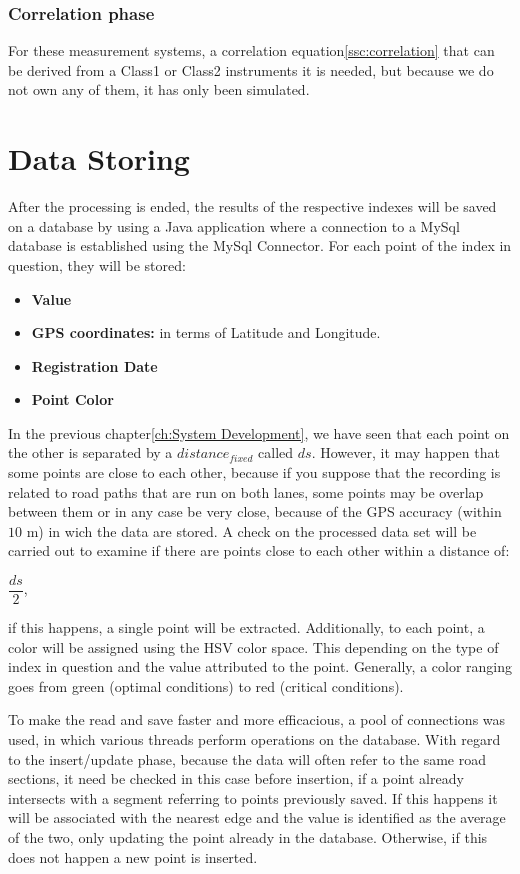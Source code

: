 \documentclass[tesi]{subfiles}
\begin{document}
\subsubsection{Correlation phase}
For these measurement systems, a correlation equation\ref{ssc:correlation} that can be derived from a Class1 or Class2 instruments it is needed, but because we do not own any of them, it has only been simulated.


\section{Data Storing}\label{sc:data_storing}
After the processing is ended, the results of the respective indexes will be saved on a database by using a Java application where a connection to a MySql database is established using the MySql Connector.
For each point of the index in question, they will be stored:
\begin{itemize}
\item \textbf{Value}
\item \textbf{GPS coordinates:} in terms of Latitude and Longitude.
\item \textbf{Registration Date}
\item \textbf{Point Color}
\end{itemize}
In the previous chapter\ref{ch:System Development}, we have seen that each point on the other is separated by a $distance_{fixed}$ called $ds$. However, it may happen that some points are close to each other, because if you suppose that the recording is related to road paths that are run on both lanes, some points may be overlap between them or in any case be very close, because of the GPS accuracy (within $10$ m) in wich the data are stored. A check on the processed data set will be carried out to examine if there are points close to each other within a distance of:

\begin{center}
$\dfrac{ds}{2}$,
\end{center}

if this happens, a single point will be extracted.
Additionally, to each point, a color will be assigned using the HSV color space. This depending on the type of index in question and the value attributed to the point. Generally, a color ranging goes from green (optimal conditions) to red (critical conditions).

To make the read and save faster and more efficacious, a pool of connections was used, in which various threads perform operations on the database. With regard to the insert/update phase, because the data will often refer to the same road sections, it need be checked in this case before insertion, if a point already intersects with a segment referring to points previously saved. If this happens it will be associated with the nearest edge and the value is identified as the average of the two, only updating the point already in the database. Otherwise, if this does not happen a new point is inserted.
\end{document}
